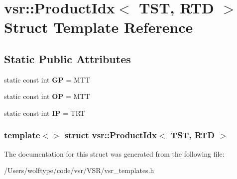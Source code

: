 \hypertarget{structvsr_1_1_product_idx_3_01_t_s_t_00_01_r_t_d_01_4}{\section{vsr\-:\-:Product\-Idx$<$ T\-S\-T, R\-T\-D $>$ Struct Template Reference}
\label{structvsr_1_1_product_idx_3_01_t_s_t_00_01_r_t_d_01_4}
}
\subsection*{Static Public Attributes}
\begin{DoxyCompactItemize}
\item 
\hypertarget{structvsr_1_1_product_idx_3_01_t_s_t_00_01_r_t_d_01_4_a64b1feb5e3d5d06a25c8e7578fb4ee52}{static const int {\bfseries G\-P} = M\-T\-T}\label{structvsr_1_1_product_idx_3_01_t_s_t_00_01_r_t_d_01_4_a64b1feb5e3d5d06a25c8e7578fb4ee52}

\item 
\hypertarget{structvsr_1_1_product_idx_3_01_t_s_t_00_01_r_t_d_01_4_a5eec74bccdd8677b1a85707e3b05a70a}{static const int {\bfseries O\-P} = M\-T\-T}\label{structvsr_1_1_product_idx_3_01_t_s_t_00_01_r_t_d_01_4_a5eec74bccdd8677b1a85707e3b05a70a}

\item 
\hypertarget{structvsr_1_1_product_idx_3_01_t_s_t_00_01_r_t_d_01_4_adf699e7bac545622c99b38f2da2acf5d}{static const int {\bfseries I\-P} = T\-R\-T}\label{structvsr_1_1_product_idx_3_01_t_s_t_00_01_r_t_d_01_4_adf699e7bac545622c99b38f2da2acf5d}

\end{DoxyCompactItemize}
\subsubsection*{template$<$$>$ struct vsr\-::\-Product\-Idx$<$ T\-S\-T, R\-T\-D $>$}



The documentation for this struct was generated from the following file\-:\begin{DoxyCompactItemize}
\item 
/\-Users/wolftype/code/vsr/\-V\-S\-R/vsr\-\_\-templates.\-h\end{DoxyCompactItemize}
